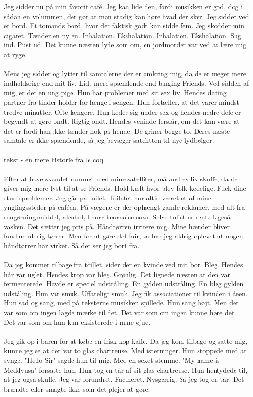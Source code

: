 \documentclass[]{article}
\begin{document}
Jeg sidder nu på min favorit café. Jeg kan lide den, fordi musikken er god, dog i sådan en volummen, der gør at man stadig kan høre hvad der sker. Jeg sidder ved et bord. Et tomands bord, hvor der faktisk godt kan sidde fem. Jeg skodder min cigaret. Tænder en ny en. Inhalation. Ekshalation. Inhalation. Ekshalation. Sug ind. Pust ud. Det kunne næsten lyde som om, en jordmorder var ved at lære mig at ryge.
\\ \\
Mens jeg sidder og lytter til samtalerne der er omkring mig, da de er meget mere indholdsrige end mit liv. Lidt mere spændende end binging Friends. Ved sidden af mig, er der en ung pige. Hun har problemer med sit sex liv. Hendes dating partner fra tinder holder for længe i sengen. Hun fortæller, at det varer mindst tredve minutter. Ofte længere. Hun keder sig under sex og hendes nedre dele er begyndt at gøre ondt. Rigtig ondt. Hendes veninde forslår, om det kan være at det er fordi han ikke tænder nok på hende. De griner begge to. Deres næste samtale er ikke spændende, så jeg bevæger satelitten til nye lydbølger. 
\\ \\
tekst - en mere historie fra le coq
\\ \\
Efter at have skandet rummet med mine satelliter, må andres liv skuffe, da de giver mig mere lyst til at se Friends. Hold kæft hvor blev folk kedelige. Fuck dine studieproblemer. Jeg går på toilet. Toiletet har altid været et af mine ynglingssteder på caféen. På vægene er der ophængt gamle reklamer, med alt fra rengørningsmiddel, alcohol, knorr bearnaise sovs. Selve toliet er rent. Ligeså vasken. Det sætter jeg pris på. Håndtørren irritere mig. Mine hænder bliver fandme aldrig tørrer. Men for at gøre det fair, så har jeg aldrig oplevet at nogen håndtørrer har virket. Så det ser jeg bort fra.
\\ \\
Da jeg kommer tilbage fra toillet, sider der en kvinde ved mit bor. Bleg. Hendes hår var uglet. Hendes krop var bleg. Grønlig. Det lignede næsten at den var fermenterede. Havde en speciel udstråling. En gylden udstråling. En bleg gylden udståling. Hun var smuk. Uffateligt smuk. Jeg fik associationer til kvinden i åeen. Hun sad og sang, med på teksterne musikken spillede. Hun sang højt. Men det var som om ingen lagde mærke til det. Det var som om ingen kunne høre det. Det var som om hun kun eksisterede i mine øjne.
\\ \\
Jeg gik op i baren for at købe en frisk kop kaffe. Da jeg kom tilbage og satte mig, kunne jeg se at der var to glas chartreuse. Med isterninger. Hun stoppede med at synge. "Hello Sir" sagde hun til mig. Med en sexet stemme. "My name is Meddyusa" forsatte hun. Hun tog en tår af sit glas chartreuse. Hun hentydede til, at jeg også skulle. Jeg var forundret. Facineret. Nysgerrig. Så jeg tog en tår. Det brændte eller smagte ikke som det plejer at gøre.
\end{document}

